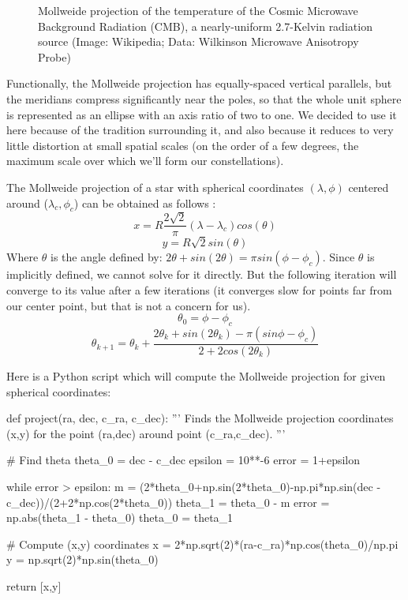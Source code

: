 \documentclass[paper=a4, fontsize=11pt]{scrartcl} %
\begin{document}
\begin{figure}
\caption{Mollweide projection of the temperature of the Cosmic Microwave Background Radiation (CMB), a nearly-uniform 2.7-Kelvin radiation source (Image: Wikipedia; Data: Wilkinson Microwave Anisotropy Probe)}
\label{moll}
\end{figure}


Functionally, the Mollweide projection has equally-spaced vertical parallels, but the meridians compress significantly near the poles, so that the whole unit sphere is represented as an ellipse with an axis ratio of two to one. We decided to use it here because of the tradition surrounding it, and also because it reduces to very little distortion at small spatial scales (on the order of a few degrees, the maximum scale over which we’ll form our constellations).

The Mollweide projection of a star with spherical coordinates $(\lambda,\phi)$ centered around ($\lambda_c,\phi_c$) can be obtained as follows \cite{Snyder1987}:
$$
x = R\frac{2\sqrt{2}}{\pi}(\lambda-\lambda_c)cos(\theta)$$$$
y = R\sqrt{2}sin(\theta)
$$
Where $\theta$ is the angle defined by: $2\theta + sin(2\theta)=\pi sin(\phi-\phi_c)$.  Since $\theta$ is implicitly defined, we cannot solve for it directly. But the following iteration will converge to its value after a few iterations (it converges slow for points far from our center point, but that is not a concern for us).
$$
\theta_0 = \phi-\phi_c
$$$$
\theta_{k+1} = \theta_k + \frac{2\theta_k+sin(2\theta_k)-\pi(sin\phi-\phi_c)}{2+2cos(2\theta_k)}
$$

Here is a Python script which will compute the Mollweide projection for given spherical coordinates:
\begin{python}

def project(ra, dec, c_ra, c_dec):
	'''
	Finds the Mollweide projection coordinates (x,y) for the point (ra,dec) around 
	point (c_ra,c_dec).
	'''
	
	# Find theta
	theta_0 = dec - c_dec
	epsilon = 10**-6
	error = 1+epsilon
	
	while error > epsilon:
	    m = (2*theta_0+np.sin(2*theta_0)-np.pi*np.sin(dec - c_dec))/(2+2*np.cos(2*theta_0))
	    theta_1 = theta_0 - m
	    error = np.abs(theta_1 - theta_0)
	    theta_0 = theta_1
	
	# Compute (x,y) coordinates
	x = 2*np.sqrt(2)*(ra-c_ra)*np.cos(theta_0)/np.pi
	y = np.sqrt(2)*np.sin(theta_0)
	
	return [x,y]
\end{python}
\end{document}
